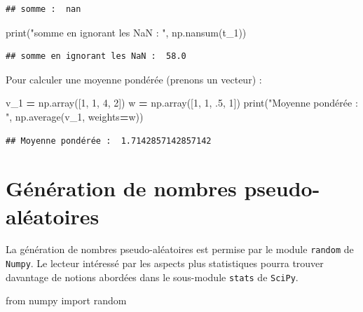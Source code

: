 \documentclass[12pt,]{book}
\newenvironment{Shaded}{\begin{snugshade}}{\end{snugshade}}
\newcommand{\DecValTok}[1]{\textcolor[rgb]{0.00,0.00,0.81}{#1}}
\newcommand{\StringTok}[1]{\textcolor[rgb]{0.31,0.60,0.02}{#1}}
\newcommand{\ImportTok}[1]{#1}
\newcommand{\OperatorTok}[1]{\textcolor[rgb]{0.81,0.36,0.00}{\textbf{#1}}}
\newcommand{\BuiltInTok}[1]{#1}
\newcommand{\NormalTok}[1]{#1}
\numberwithin{equation}{section}
\numberwithin{countremarque}{section}
\begin{document}
\begin{lstlisting}
## somme :  nan
\end{lstlisting}

\begin{Shaded}
\begin{Highlighting}[]
\BuiltInTok{print}\NormalTok{(}\StringTok{"somme en ignorant les NaN : "}\NormalTok{, np.nansum(t_1))}
\end{Highlighting}
\end{Shaded}

\begin{lstlisting}
## somme en ignorant les NaN :  58.0
\end{lstlisting}

Pour calculer une moyenne pondérée (prenons un vecteur) :

\begin{Shaded}
\begin{Highlighting}[]
\NormalTok{v_1 }\OperatorTok{=}\NormalTok{ np.array([}\DecValTok{1}\NormalTok{, }\DecValTok{1}\NormalTok{, }\DecValTok{4}\NormalTok{, }\DecValTok{2}\NormalTok{])}
\NormalTok{w }\OperatorTok{=}\NormalTok{ np.array([}\DecValTok{1}\NormalTok{, }\DecValTok{1}\NormalTok{, .}\DecValTok{5}\NormalTok{, }\DecValTok{1}\NormalTok{])}
\BuiltInTok{print}\NormalTok{(}\StringTok{"Moyenne pondérée : "}\NormalTok{, np.average(v_1, weights}\OperatorTok{=}\NormalTok{w))}
\end{Highlighting}
\end{Shaded}

\begin{lstlisting}
## Moyenne pondérée :  1.7142857142857142
\end{lstlisting}

\section{Génération de nombres
pseudo-aléatoires}\label{generation-de-nombres-pseudo-aleatoires}

La génération de nombres pseudo-aléatoires est permise par le module
\texttt{random} de \texttt{Numpy}. Le lecteur intéressé par les aspects
plus statistiques pourra trouver davantage de notions abordées dans le
sous-module \texttt{stats} de \texttt{SciPy}.

\begin{Shaded}
\begin{Highlighting}[]
\ImportTok{from}\NormalTok{ numpy }\ImportTok{import}\NormalTok{ random}
\end{Highlighting}
\end{Shaded}
\end{document}

